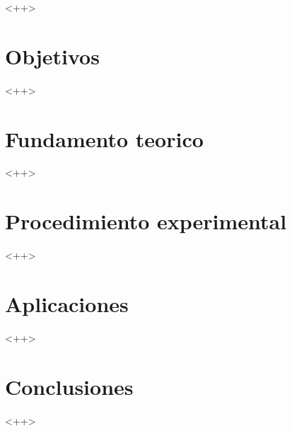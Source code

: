 \documentclass[11pt,conference,a4paper]{IEEEtran}
\begin{document}
\maketitle

\begin{abstract}
    <++>
\end{abstract}

\begin{IEEEkeywords}
<++>
\end{IEEEkeywords}

\section{Objetivos}

<++>
\section{Fundamento teorico}

<++>

\section{Procedimiento experimental}

<++>

\section{Aplicaciones}

<++>

\section{Conclusiones}

<++>
\end{document}
